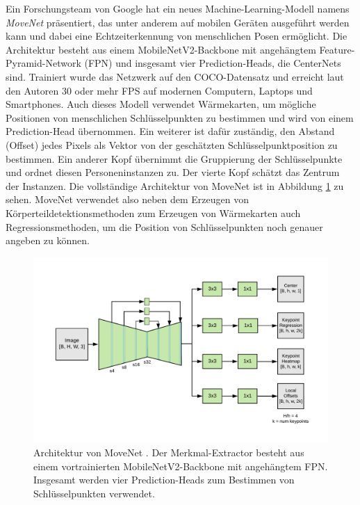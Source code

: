 Ein Forschungsteam von Google hat ein neues Machine-Learning-Modell namens
\textit{MoveNet} \cite{movenet} präsentiert, das unter anderem auf mobilen
Geräten ausgeführt werden kann und dabei eine Echtzeiterkennung von menschlichen
Posen ermöglicht. Die Architektur besteht aus einem MobileNetV2-Backbone mit
angehängtem Feature-Pyramid-Network (FPN) und insgesamt vier Prediction-Heads,
die CenterNets \cite{zhou2019objects} sind. Trainiert wurde das Netzwerk
auf den COCO-Datensatz und erreicht laut den Autoren 30 oder mehr FPS auf
modernen Computern, Laptops und Smartphones. Auch dieses Modell verwendet
Wärmekarten, um mögliche Positionen von menschlichen Schlüsselpunkten zu
bestimmen und wird von einem Prediction-Head übernommen. Ein weiterer ist dafür
zuständig, den Abstand (Offset) jedes Pixels als Vektor von der geschätzten
Schlüsselpunktposition zu bestimmen. Ein anderer Kopf übernimmt die Gruppierung
der Schlüsselpunkte und ordnet diesen Personeninstanzen zu. Der vierte Kopf
schätzt das Zentrum der Instanzen. Die vollständige Architektur von MoveNet ist
in Abbildung \ref{fig:movenet-architecture} zu sehen. MoveNet verwendet also
neben dem Erzeugen von Körperteildetektionsmethoden zum Erzeugen von Wärmekarten
auch Regressionsmethoden, um die Position von Schlüsselpunkten noch genauer
angeben zu können.

\begin{figure}
    \includegraphics[width=\textwidth]{images/movenet_architecture.png}
    \caption{Architektur von MoveNet \cite{movenet}. Der Merkmal-Extractor
    besteht aus einem vortrainierten MobileNetV2-Backbone mit angehängtem FPN.
    Insgesamt werden vier Prediction-Heads zum Bestimmen von Schlüsselpunkten
    verwendet.}
    \label{fig:movenet-architecture}
\end{figure}

